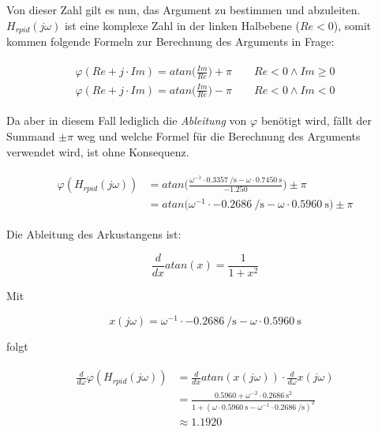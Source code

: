 Von   dieser   Zahl   gilt   es   nun,   das   Argument   zu   bestimmen   und
abzuleiten. $H_{rpid}(j\omega)$ ist eine komplexe Zahl in der linken Halbebene
($Re <  0$), somit  kommen folgende  Formeln zur  Berechnung des  Arguments in
Frage:

\begin{gather} \label{eq:app:argument}
    \begin{split}
        \varphi(Re + j \cdot Im) = atan \biggl( \frac{Im}{Re} \biggr) + \pi \hspace{2em} Re < 0 \land Im \geq 0 \\
        \varphi(Re + j \cdot Im) = atan \biggl( \frac{Im}{Re} \biggr) - \pi \hspace{2em} Re < 0 \land Im < 0
    \end{split}
\end{gather}

Da aber in diesem Fall lediglich die \emph{Ableitung} von $\varphi$ ben\"otigt
wird, f\"allt der Summand $\pm\pi$ weg  und welche Formel f\"ur die Berechnung
des  Arguments   verwendet  wird,  ist  ohne   Konsequenz.

\begin{gather} \label{eq:app:argument_numerical}
    \begin{split}
        \varphi(H_{rpid}(j\omega)) & = atan \biggl( \frac{ \omega^{-1} \cdot \SI{0.3357}{\per\second} - \omega \cdot \SI{0.7450}{\second} }{ -1.250 } \biggr) \pm \pi \\
                                   & = atan \biggl( \omega^{-1} \cdot \SI{-0.2686}{\per\second}       - \omega \cdot \SI{0.5960}{\second}             \biggr) \pm \pi
    \end{split}
\end{gather}

Die Ableitung des Arkustangens ist:

\begin{equation} \label{eq:app:d_atan}
    \frac{d}{dx} atan(x) = \frac{1}{1+x^2}
\end{equation}

Mit

\begin{equation} \label{eq:app:x_of_omega}
    x(j\omega) = \omega^{-1} \cdot \SI{-0.2686}{\per\second} - \omega \cdot \SI{0.5960}{\second}
\end{equation}

folgt

\begin{gather} \label{eq:app:d_argument}
    \begin{split}
        \frac{d}{d\omega} \varphi(H_{rpid}(j\omega)) & = \frac{d}{dx} atan(x(j\omega)) \cdot \frac{d}{d\omega} x(j\omega) \\
                                                     & = \frac{0.5960 + \omega^{-2} \cdot \SI{0.2686}{\square\second}}{1+(\omega \cdot \SI{0.5960}{\second} - \omega^{-1} \cdot \SI{0.2686}{\per\second})^2} \\
                                                     & \approx 1.1920
    \end{split}
\end{gather}


